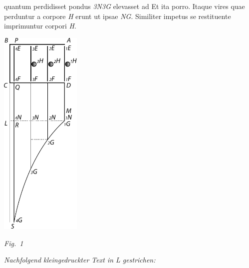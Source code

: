 quantum perdidisset
%
%
pondus \textit{{\scriptsize{3}}N{\scriptsize{3}}G} elevasset ad
%
%
Et ita porro.
Itaque vires\protect{}
quae perduntur a corpore\protect{} \textit{H}
erunt ut ipsae \textit{NG}.
Similiter impetus\protect{}
%
%
se restituente\protect{} imprimuntur corpori \textit{H}.
\pend%
 \vspace{2.0em}
  \centerline{\includegraphics[width=0.29\textwidth]{gesamttex/edit_VIII,3/images/LH_35_10_08_015_d.pdf}}%
  \vspace{-1.0em}
  \centerline{\hspace{16mm}\lbrack\textit{Fig.~1}\rbrack}%
  \label{LH_35_10_08_015r_Fig.1}%
\newpage%
%
\pstart%
\noindent%
\lbrack\textit{Nachfolgend kleingedruckter Text in L gestrichen:}\rbrack\
\pend%
\vspace{0.5em}%
\footnotesize%
\pstart%
\noindent%
